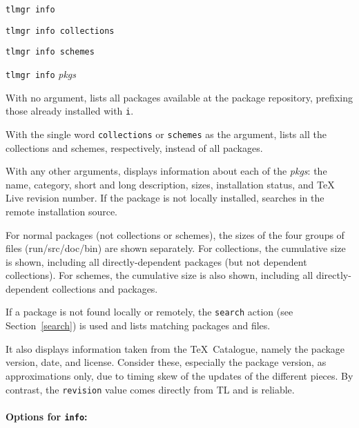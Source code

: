 \documentclass[11pt]{article}
\begin{document}
\begin{list}{}{}
\item \texttt{tlmgr info} 
\item \texttt{tlmgr info collections} 
\item \texttt{tlmgr info schemes}
\item \texttt{tlmgr info} \textsl{pkgs} 
\end{list}

With no argument, lists all packages available at the
package repository, prefixing those already installed with
\texttt{i}.

With the single word \texttt{collections} or
\texttt{schemes} as the argument, lists all the collections
and schemes, respectively, instead of all packages.

With any other arguments, displays information about each
of the \textsl{pkgs}: the name, category, short and long
description, sizes, installation status, and \TeX\,Live
revision number. If the package is not locally installed,
searches in the remote installation source.

For normal packages (not collections or schemes), the sizes
of the four groups of files (run/src/doc/bin) are shown
separately. For collections, the cumulative size is shown,
including all directly-dependent packages (but not dependent
collections). For schemes, the cumulative size is also
shown, including all directly-dependent collections and
packages.

If a package is not found locally or remotely, the
\texttt{search} action (see Section~\ref{search}) is used
and lists matching packages and files.

It also displays information taken from the \TeX\ Catalogue,
namely the package version, date, and license. Consider
these, especially the package version, as approximations
only, due to timing skew of the updates of the different
pieces. By contrast, the \texttt{revision} value comes
directly from TL and is reliable.


\paragraph{Options for \mdseries\texttt{info}:}
\end{document}
